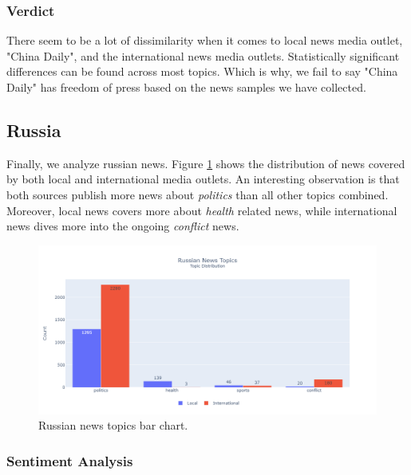 \documentclass{article}
\theoremstyle{mytheoremstyle}
\theoremstyle{mytheoremstyle}
\theoremstyle{myproblemstyle}
\begin{document}
    \subsubsection{Verdict}

    There seem to be a lot of dissimilarity when it comes to local news media outlet, "China Daily", and the international news media outlets. Statistically significant differences can be found across most topics. Which is why, we fail to say "China Daily" has freedom of press based on the news samples we have collected.

    \subsection{Russia}

    Finally, we analyze russian news. Figure \ref{fig:russia_topic} shows the distribution of news covered by both local and international media outlets. An interesting observation is that both sources publish more news about \emph{politics} than all other topics combined. Moreover, local news covers more about \emph{health} related news, while international news dives more into the ongoing \emph{conflict} news.
    
    \begin{figure}[hp]
        \centering
        \includegraphics[width=\linewidth]{../images/plots/Russia/russia_barchart_topics.png}
        \caption{Russian news topics bar chart.}
        \label{fig:russia_topic}
    \end{figure}

    \subsubsection{Sentiment Analysis}
    
\end{document}
